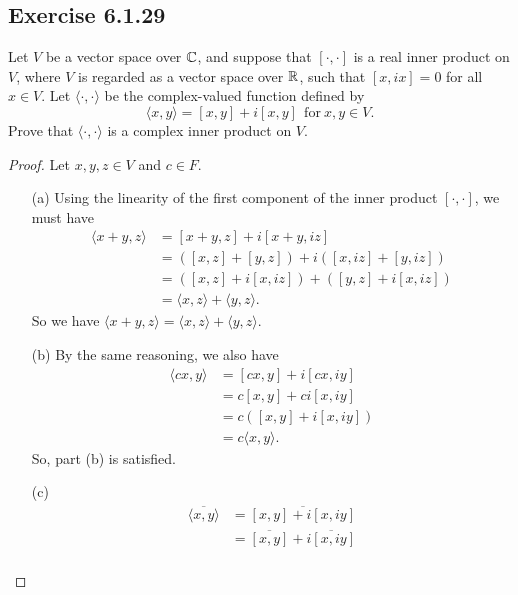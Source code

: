 \subsection*{Exercise 6.1.29} Let \( V  \) be a vector space over \( \mathbb{C}  \), and suppose that \( [\cdot,\cdot] \) is a real inner product on \( V  \), where \( V  \) is regarded as a vector space over \( \mathbb{R}  \), such that \( [x,ix] = 0  \) for all \( x \in V  \). Let \( \langle \cdot , \cdot \rangle \) be the complex-valued function defined by
\[  \langle x , y \rangle = [x,y] + i [x,y] \ \ \text{for} \ x,y \in V. \]
Prove that \( \langle \cdot , \cdot \rangle  \) is a complex inner product on \( V  \).
\begin{proof}
    Let \( x,y,z \in V  \) and \( c \in F  \). \begin{enumerate}
        \item[(a)] Using the linearity of the first component of the inner product \( [\cdot, \cdot] \), we must have
            \begin{align*}
                \langle x + y  , z  \rangle &= [ x + y, z ] + i [x + y, iz] \\
                                            &=  ([x ,z] + [y,z]) + i ([x,iz] + [y,iz]) \\
                                            &= ([x,z] + i[x,iz]) + ([y,z] + i[x,iz]) \\
                                            &= \langle x , z \rangle + \langle y , z \rangle.
            \end{align*}
            So we have \( \langle x +y  , z  \rangle = \langle x  , z \rangle + \langle y , z \rangle \).
        \item[(b)] By the same reasoning, we also have
            \begin{align*}
                \langle cx  , y \rangle &= [cx,y] + i[cx,iy] \\
                                        &= c [x,y] + ci[ x,iy] \\
                                        &= c ([x,y] + i[x,iy]) \\
                                        &= c \langle x , y \rangle.
            \end{align*}
            So, part (b) is satisfied.
        \item[(c)] 
            \begin{align*}
                \overline{\langle x , y \rangle} &= \overline{[x,y] + i [x,iy]} \\
                                                 &= \overline{[x,y]} + \overline{i [x,iy]} \\

\end{align*}
\end{enumerate}
\end{proof}
